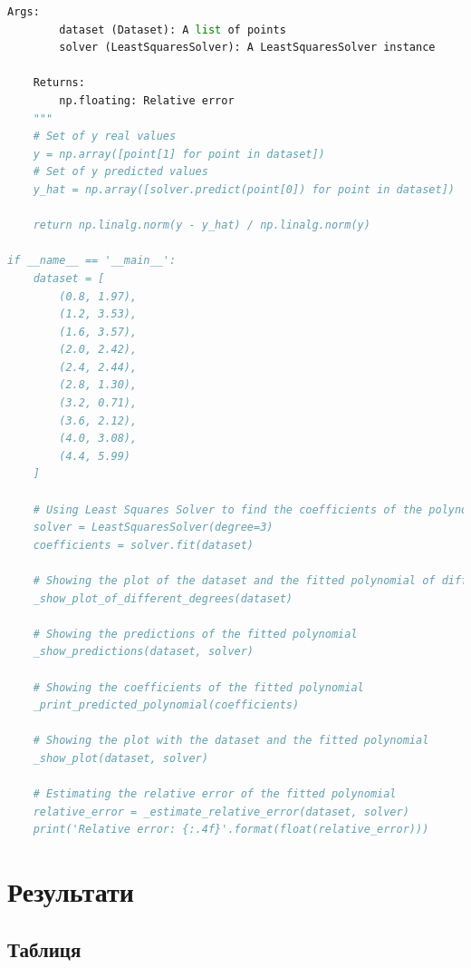 \documentclass[12pt]{extarticle}
\begin{document}
\begin{lstlisting}[language=Python, caption=Запуск методу найближчих квадратів]
    Args:
        dataset (Dataset): A list of points
        solver (LeastSquaresSolver): A LeastSquaresSolver instance

    Returns:
        np.floating: Relative error
    """
    # Set of y real values
    y = np.array([point[1] for point in dataset])
    # Set of y predicted values
    y_hat = np.array([solver.predict(point[0]) for point in dataset])
    
    return np.linalg.norm(y - y_hat) / np.linalg.norm(y)

if __name__ == '__main__':
    dataset = [
        (0.8, 1.97),
        (1.2, 3.53),
        (1.6, 3.57),
        (2.0, 2.42),
        (2.4, 2.44),
        (2.8, 1.30),
        (3.2, 0.71),
        (3.6, 2.12),
        (4.0, 3.08),
        (4.4, 5.99)
    ]
    
    # Using Least Squares Solver to find the coefficients of the polynomial
    solver = LeastSquaresSolver(degree=3)
    coefficients = solver.fit(dataset)
    
    # Showing the plot of the dataset and the fitted polynomial of different degrees
    _show_plot_of_different_degrees(dataset)
    
    # Showing the predictions of the fitted polynomial
    _show_predictions(dataset, solver)
    
    # Showing the coefficients of the fitted polynomial
    _print_predicted_polynomial(coefficients)
    
    # Showing the plot with the dataset and the fitted polynomial
    _show_plot(dataset, solver)
    
    # Estimating the relative error of the fitted polynomial
    relative_error = _estimate_relative_error(dataset, solver)
    print('Relative error: {:.4f}'.format(float(relative_error)))
\end{lstlisting}

\pagebreak

\section{Результати}

\subsection{Таблиця}
\end{document}
